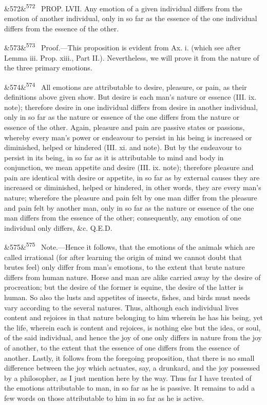 \documentclass[12pt]{article}
\newcommand{\para}[1][]{\par\noindent\ifx&#1&\else\textsuperscript{\footnotesize #1}~\fi}
\begin{document}
\para[572] PROP. LVII. Any emotion of a given individual differs from the emotion of another individual, only in so far as the essence of the one individual differs from the essence of the other.

\para[573] Proof.---This proposition is evident from Ax. i. (which see after Lemma iii. Prop. xiii., Part II.). Nevertheless, we will prove it from the nature of the three primary emotions.

\para[574] All emotions are attributable to desire, pleasure, or pain, as their definitions above given show. But desire is each man's nature or essence (III. ix. note); therefore desire in one individual differs from desire in another individual, only in so far as the nature or essence of the one differs from the nature or essence of the other. Again, pleasure and pain are passive states or passions, whereby every man's power or endeavour to persist in his being is increased or diminished, helped or hindered (III. xi. and note). But by the endeavour to persist in its being, in so far as it is attributable to mind and body in conjunction, we mean appetite and desire (III. ix. note); therefore pleasure and pain are identical with desire or appetite, in so far as by external causes they are increased or diminished, helped or hindered, in other words, they are every man's nature; wherefore the pleasure and pain felt by one man differ from the pleasure and pain felt by another man, only in so far as the nature or essence of the one man differs from the essence of the other; consequently, any emotion of one individual only differs, \&c. Q.E.D.

\para[575] Note.---Hence it follows, that the emotions of the animals which are called irrational (for after learning the origin of mind we cannot doubt that brutes feel) only differ from man's emotions, to the extent that brute nature differs from human nature. Horse and man are alike carried away by the desire of procreation; but the desire of the former is equine, the desire of the latter is human. So also the lusts and appetites of insects, fishes, and birds must needs vary according to the several natures. Thus, although each individual lives content and rejoices in that nature belonging to him wherein he has his being, yet the life, wherein each is content and rejoices, is nothing else but the idea, or soul, of the said individual, and hence the joy of one only differs in nature from the joy of another, to the extent that the essence of one differs from the essence of another. Lastly, it follows from the foregoing proposition, that there is no small difference between the joy which actuates, say, a drunkard, and the joy possessed by a philosopher, as I just mention here by the way. Thus far I have treated of the emotions attributable to man, in so far as he is passive. It remains to add a few words on those attributable to him in so far as he is active.
\end{document}
